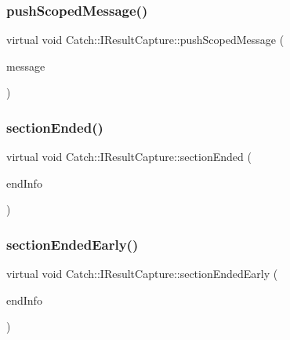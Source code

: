\subsubsection{\texorpdfstring{push\+Scoped\+Message()}{pushScopedMessage()}}
{\footnotesize\ttfamily virtual void Catch\+::\+I\+Result\+Capture\+::push\+Scoped\+Message (\begin{DoxyParamCaption}\item[{\hyperlink{struct_catch_1_1_message_info}{Message\+Info} const \&}]{message }\end{DoxyParamCaption})\hspace{0.3cm}{\ttfamily [pure virtual]}}

\mbox{\label{struct_catch_1_1_i_result_capture_a4e152bc43dc0933684e31fa67a58195d}} 
\subsubsection{\texorpdfstring{section\+Ended()}{sectionEnded()}}
{\footnotesize\ttfamily virtual void Catch\+::\+I\+Result\+Capture\+::section\+Ended (\begin{DoxyParamCaption}\item[{\hyperlink{struct_catch_1_1_section_end_info}{Section\+End\+Info} const \&}]{end\+Info }\end{DoxyParamCaption})\hspace{0.3cm}{\ttfamily [pure virtual]}}

\mbox{\label{struct_catch_1_1_i_result_capture_afcc71eef8ca821ae132cced4a2be6988}} 
\subsubsection{\texorpdfstring{section\+Ended\+Early()}{sectionEndedEarly()}}
{\footnotesize\ttfamily virtual void Catch\+::\+I\+Result\+Capture\+::section\+Ended\+Early (\begin{DoxyParamCaption}\item[{\hyperlink{struct_catch_1_1_section_end_info}{Section\+End\+Info} const \&}]{end\+Info }\end{DoxyParamCaption})\hspace{0.3cm}{\ttfamily [pure virtual]}}

